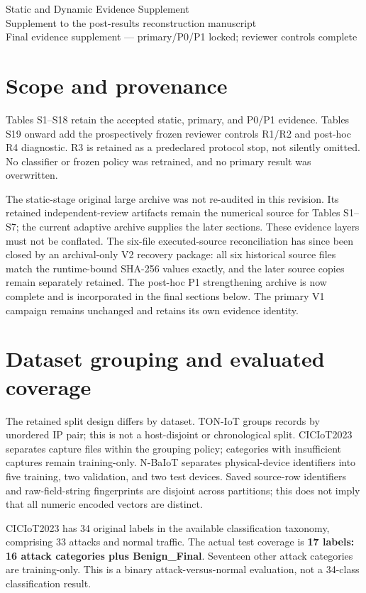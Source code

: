 \documentclass[10pt,a4paper]{article}
\begin{document}
\begin{center}
{\LARGE Static and Dynamic Evidence Supplement}\\[6pt]
{\large Supplement to the post-results reconstruction manuscript}\\[4pt]
Final evidence supplement --- primary/P0/P1 locked; reviewer controls complete
\end{center}

\section{Scope and provenance}
Tables S1--S18 retain the accepted static, primary, and P0/P1 evidence. Tables S19 onward add the prospectively frozen reviewer controls R1/R2 and post-hoc R4 diagnostic. R3 is retained as a predeclared protocol stop, not silently omitted. No classifier or frozen policy was retrained, and no primary result was overwritten.

The static-stage original large archive was not re-audited in this revision. Its retained independent-review artifacts remain the numerical source for Tables S1--S7; the current adaptive archive supplies the later sections. These evidence layers must not be conflated. The six-file executed-source reconciliation has since been closed by an archival-only V2 recovery package: all six historical source files match the runtime-bound SHA-256 values exactly, and the later source copies remain separately retained. The post-hoc P1 strengthening archive is now complete and is incorporated in the final sections below. The primary V1 campaign remains unchanged and retains its own evidence identity.

\section{Dataset grouping and evaluated coverage}
The retained split design differs by dataset. TON-IoT groups records by unordered IP pair; this is not a host-disjoint or chronological split. CICIoT2023 separates capture files within the grouping policy; categories with insufficient captures remain training-only. N-BaIoT separates physical-device identifiers into five training, two validation, and two test devices. Saved source-row identifiers and raw-field-string fingerprints are disjoint across partitions; this does not imply that all numeric encoded vectors are distinct.

CICIoT2023 has 34 original labels in the available classification taxonomy, comprising 33 attacks and normal traffic. The actual test coverage is \textbf{17 labels: 16 attack categories plus Benign\_Final}. Seventeen other attack categories are training-only. This is a binary attack-versus-normal evaluation, not a 34-class classification result.
\end{document}
